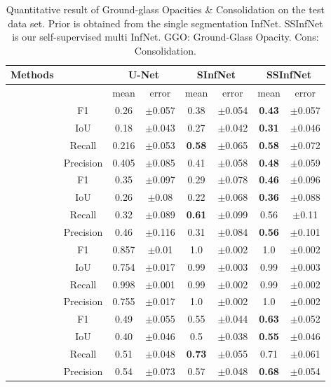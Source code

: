 \begin{table}[!h]
	\centering
	\begin{tabular}{ |c|c|c|c|c|c|c|c| }
		\hline
		Methods & & \multicolumn{2}{c|}{U-Net} & \multicolumn{2}{c|}{SInfNet} & \multicolumn{2}{c|}{SSInfNet}  \\ \hline
		&  &mean & error & mean & error & mean & error \\ \hline
		
		\multirow{4}{*}{\rotatebox[origin=c]{90}{GGO}} 
		& F1 & 0.26 & $\pm$0.057 & 0.38 &$\pm$0.054 & \textbf{0.43} & $\pm$0.057 \\ \cline{2-8}
		& IoU & 0.18 &$\pm$0.043 &0.27 &$\pm$0.042 &
		\textbf{0.31} &$\pm$0.046 \\ \cline{2-8}
		& Recall & 0.216 &$\pm$0.053 &\textbf{0.58} &$\pm$0.065 &\textbf{0.58} &$\pm$0.072 \\ \cline{2-8}
		& Precision & 0.405 &$\pm$0.085 &0.41 &$\pm$0.058 &
		\textbf{0.48} &$\pm$0.059 \\ \cline{2-8}
		\hline \hline
		
		\multirow{4}{*}{\rotatebox[origin=c]{90}{Cons}} 
		& F1 & 0.35 &$\pm$0.097 &0.29 &$\pm$0.078 &\textbf{0.46} &$\pm$0.096 \\ \cline{2-8}
		& IoU & 0.26& $\pm$0.08&0.22 &$\pm$0.068 &\textbf{0.36} &$\pm$0.088 \\ \cline{2-8}
		& Recall &0.32 &$\pm$0.089 &\textbf{0.61} &$\pm$0.099 &0.56 &$\pm$0.11 \\ \cline{2-8}
		& Precision & 0.46 &$\pm$0.116 &0.31 &$\pm$0.084 &\textbf{0.56} &$\pm$0.101 \\ \cline{2-8}
		\hline \hline
		
		\multirow{4}{*}{\rotatebox[origin=c]{90}{Background}} 
		& F1 & 0.857&$\pm$0.01 &1.0 &$\pm$0.002 &1.0 &$\pm$0.002 \\ \cline{2-8}
		& IoU & 0.754&$\pm$0.017 &0.99 &$\pm$0.003 &0.99 &$\pm$0.003 \\ \cline{2-8}
		& Recall &0.998 &$\pm$0.001 &0.99 &$\pm$0.002 &0.99 &$\pm$0.002 \\ \cline{2-8}
		& Precision &0.755 &$\pm$0.017 &1.0 &$\pm$0.002 &1.0 &$\pm$0.002 \\ \cline{2-8}
		\hline \hline
		
		\multirow{4}{*}{\rotatebox[origin=c]{90}{Overall}} 
		& F1 &0.49 &$\pm$0.055 &0.55 &$\pm$0.044 &\textbf{0.63} &$\pm$0.052 \\ \cline{2-8}
		& IoU & 0.40 &$\pm$0.046 &0.5 &$\pm$0.038 &\textbf{0.55} &$\pm$0.046 \\ \cline{2-8}
		& Recall &0.51 &$\pm$0.048 &\textbf{0.73} &$\pm$0.055 &0.71 &$\pm$0.061 \\ \cline{2-8}
		& Precision &0.54 &$\pm$0.073 &0.57 &$\pm$0.048 &\textbf{0.68} &$\pm$0.054 \\ \cline{2-8}
		\hline \hline
		
	\end{tabular}
\caption{Quantitative result of Ground-glass Opacities \& Consolidation on the test data set. Prior is obtained from the single segmentation InfNet. SSInfNet is our self-supervised multi InfNet. GGO: Ground-Glass Opacity. Cons: Consolidation. }
\label{tab:multi-weakprior}
\end{table}


